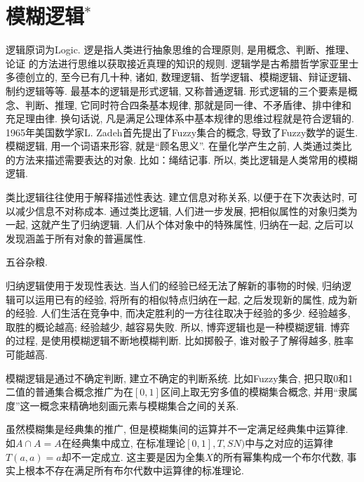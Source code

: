 \section{模糊逻辑$^*$}
逻辑原词为Logic. 逻是指人类进行抽象思维的合理原则, 是用概念、判断、推理、论证 的方法进行思维以获取接近真理的知识的规则. 逻辑学是古希腊哲学家亚里士多德创立的, 至今已有几十种, 诸如, 数理逻辑、哲学逻辑、模糊逻辑、辩证逻辑、制约逻辑等等. 最基本的逻辑是形式逻辑, 又称普通逻辑. 形式逻辑的三个要素是概念、判断、推理, 它同时符合四条基本规律, 那就是同一律、不矛盾律、排中律和充足理由律. 换句话说, 凡是满足公理体系中基本规律的思维过程就是符合逻辑的.
1965年美国数学家L. Zadeh首先提出了Fuzzy集合的概念, 导致了Fuzzy数学的诞生.
模糊逻辑, 用一个词语来形容, 就是“顾名思义”. 在量化学产生之前, 人类通过类比的方法来描述需要表达的对象. 比如：绳结记事. 所以, 类比逻辑是人类常用的模糊逻辑.

类比逻辑往往使用于解释描述性表达. 建立信息对称关系, 以便于在下次表达时, 可以减少信息不对称成本.
通过类比逻辑, 人们进一步发展, 把相似属性的对象归类为一起, 这就产生了归纳逻辑. 人们从个体对象中的特殊属性, 归纳在一起, 之后可以发现涵盖于所有对象的普遍属性.
\begin{example}
  五谷杂粮.
\end{example}

归纳逻辑使用于发现性表达. 当人们的经验已经无法了解新的事物的时候, 归纳逻辑可以运用已有的经验, 将所有的相似特点归纳在一起, 之后发现新的属性, 成为新的经验.
人们生活在竞争中, 而决定胜利的一方往往取决于经验的多少. 经验越多, 取胜的概论越高; 经验越少, 越容易失败. 所以, 博弈逻辑也是一种模糊逻辑. 博弈的过程, 是使用模糊逻辑不断地模糊判断. 比如掷骰子, 谁对骰子了解得越多, 胜率可能越高.

模糊逻辑是通过不确定判断, 建立不确定的判断系统. 比如Fuzzy集合, 把只取0和1二值的普通集合概念推广为在$[0, 1]$区间上取无穷多值的模糊集合概念, 并用“隶属度”这一概念来精确地刻画元素与模糊集合之间的关系.
\begin{remark}
虽然模糊集是经典集的推广, 但是模糊集间的运算并不一定满足经典集中运算律.
如$A\cap A=A$在经典集中成立, 在标准理论$[0,1],T,SN)$中与之对应的运算律$T(a,a)=a$却不一定成立.
这主要是因为全集$X$的所有幂集构成一个布尔代数, 事实上根本不存在满足所有布尔代数中运算律的标准理论. 
\end{remark}

